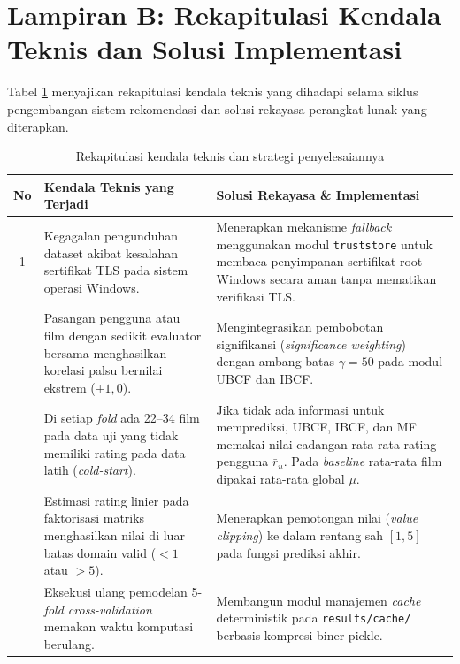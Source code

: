 \vspace{1cm}
\section*{Lampiran B: Rekapitulasi Kendala Teknis dan Solusi Implementasi}

Tabel \ref{tab:lampiran_kendala} menyajikan rekapitulasi kendala teknis yang dihadapi selama siklus pengembangan sistem rekomendasi dan solusi rekayasa perangkat lunak yang diterapkan.

\begin{table}[htbp]
\centering
\caption{Rekapitulasi kendala teknis dan strategi penyelesaiannya}
\label{tab:lampiran_kendala}
\small
\begin{tabularx}{\textwidth}{c X X}
\toprule
\textbf{No} & \textbf{Kendala Teknis yang Terjadi} & \textbf{Solusi Rekayasa \& Implementasi} \\
\midrule
1 & Kegagalan pengunduhan dataset akibat kesalahan sertifikat TLS pada sistem operasi Windows. & Menerapkan mekanisme \textit{fallback} menggunakan modul \texttt{truststore} untuk membaca penyimpanan sertifikat root Windows secara aman tanpa mematikan verifikasi TLS. \\
\addlinespace
2 & Pasangan pengguna atau film dengan sedikit evaluator bersama menghasilkan korelasi palsu bernilai ekstrem ($\pm 1,0$). & Mengintegrasikan pembobotan signifikansi (\textit{significance weighting}) dengan ambang batas $\gamma = 50$ pada modul UBCF dan IBCF. \\
\addlinespace
3 & Di setiap \textit{fold} ada 22--34 film pada data uji yang tidak memiliki rating pada data latih (\textit{cold-start}). & Jika tidak ada informasi untuk memprediksi, UBCF, IBCF, dan MF memakai nilai cadangan rata-rata rating pengguna $\bar{r}_u$. Pada \textit{baseline} rata-rata film dipakai rata-rata global $\mu$. \\
\addlinespace
4 & Estimasi rating linier pada faktorisasi matriks menghasilkan nilai di luar batas domain valid ($< 1$ atau $> 5$). & Menerapkan pemotongan nilai (\textit{value clipping}) ke dalam rentang sah $[1, 5]$ pada fungsi prediksi akhir. \\
\addlinespace
5 & Eksekusi ulang pemodelan 5-\textit{fold cross-validation} memakan waktu komputasi berulang. & Membangun modul manajemen \textit{cache} deterministik pada \texttt{results/cache/} berbasis kompresi biner pickle. \\
\bottomrule
\end{tabularx}
\end{table}
